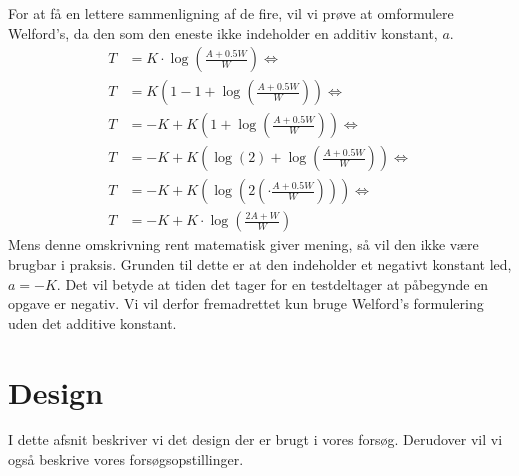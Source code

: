 For at få en lettere sammenligning af de fire, vil vi prøve at omformulere Welford's, da den som den eneste ikke indeholder en additiv konstant, $a$. 
\begin{align*}
T &= K\cdot\log\left(\frac{A+0.5W}{W}\right)\Leftrightarrow\\
T &= K\left(1-1+\log\left(\frac{A+0.5W}{W}\right)\right)\Leftrightarrow\\
T &= -K+K\left(1+\log\left(\frac{A+0.5W}{W}\right)\right)\Leftrightarrow\\
T &= -K+K\left(\log(2)+\log\left(\frac{A+0.5W}{W}\right)\right)\Leftrightarrow\\
T &= -K+K\left(\log\left(2\left(\cdot\frac{A+0.5W}{W}\right)\right)\right)\Leftrightarrow\\
T &= -K+K\cdot\log\left(\frac{2A+W}{W}\right)
\end{align*}
Mens denne omskrivning rent matematisk giver mening, så vil den ikke være brugbar i praksis. Grunden til dette er at den indeholder et negativt konstant led, $a=-K$. Det vil betyde at tiden det tager for en testdeltager at påbegynde en opgave er negativ. Vi vil derfor fremadrettet kun bruge Welford's formulering uden det additive konstant.



\newpage
{}
\chapter*{Design}
I dette afsnit beskriver vi det design der er brugt i vores forsøg. Derudover vil vi også beskrive vores forsøgsopstillinger.

